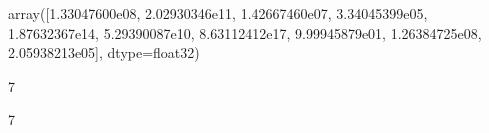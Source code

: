 \documentclass[letterpaper,10pt,french]{sphinxmanual}
\begin{document}
\begin{sphinxVerbatim}[commandchars=\\\{\}]
  \PYG{p}{[} 
                                         \PYG{p}{]}
\end{sphinxVerbatim}

\begin{sphinxVerbatim}[commandchars=\\\{\}]
  
\end{sphinxVerbatim}

\begin{sphinxVerbatim}[commandchars=\\\{\}]
\PYG{p}{[}\PYG{p}{]}
\end{sphinxVerbatim}

\begin{sphinxVerbatim}[commandchars=\\\{\}]
array([1.33047600e\PYGZhy{}08, 2.02930346e\PYGZhy{}11, 1.42667460e\PYGZhy{}07, 3.34045399e\PYGZhy{}05,
       1.87632367e\PYGZhy{}14, 5.29390087e\PYGZhy{}10, 8.63112412e\PYGZhy{}17, 9.99945879e\PYGZhy{}01,
       1.26384725e\PYGZhy{}08, 2.05938213e\PYGZhy{}05], dtype=float32)
\end{sphinxVerbatim}

\begin{sphinxVerbatim}[commandchars=\\\{\}]
\PYG{p}{[}\PYG{p}{]}
\end{sphinxVerbatim}

\begin{sphinxVerbatim}[commandchars=\\\{\}]
7
\end{sphinxVerbatim}

\begin{sphinxVerbatim}[commandchars=\\\{\}]
\PYG{p}{[}\PYG{p}{]}
\end{sphinxVerbatim}

\begin{sphinxVerbatim}[commandchars=\\\{\}]
7
\end{sphinxVerbatim}
\end{document}
